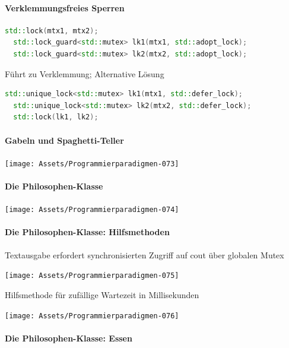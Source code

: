 \documentclass[10pt]{article}
\begin{document}
  \paragraph{Verklemmungsfreies Sperren}
  
  \begin{lstlisting}[language=C++]
  std::lock(mtx1, mtx2);
  std::lock_guard<std::mutex> lk1(mtx1, std::adopt_lock);
  std::lock_guard<std::mutex> lk2(mtx2, std::adopt_lock);
  \end{lstlisting}
  Führt zu Verklemmung; Alternative Lösung
  \begin{lstlisting}[language=C++]
  std::unique_lock<std::mutex> lk1(mtx1, std::defer_lock);
  std::unique_lock<std::mutex> lk2(mtx2, std::defer_lock);
  std::lock(lk1, lk2);
  \end{lstlisting}
  
  \paragraph{Gabeln und Spaghetti-Teller}
  
  \begin{center}
    \texttt{[image: Assets/Programmierparadigmen-073]}
  \end{center}
  
  \paragraph{Die Philosophen-Klasse}
  
  \begin{center}
    \texttt{[image: Assets/Programmierparadigmen-074]}
  \end{center}
  
  \paragraph{Die Philosophen-Klasse: Hilfsmethoden}
  
  Textausgabe erfordert synchronisierten Zugriff auf cout über globalen Mutex
  \begin{center}
    \texttt{[image: Assets/Programmierparadigmen-075]}
  \end{center}

  Hilfsmethode für zufällige Wartezeit in Millisekunden
  \begin{center}
    \texttt{[image: Assets/Programmierparadigmen-076]}
  \end{center}
  
  \paragraph{Die Philosophen-Klasse: Essen}
  
\end{document}
